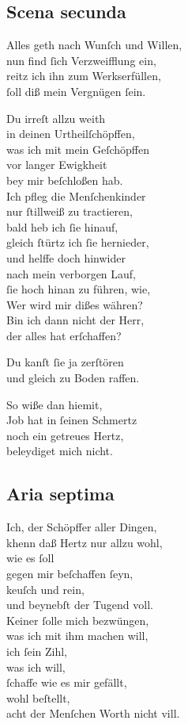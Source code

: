 \documentclass{ees}
\newenvironment{lyrics}[1]{%
  \subsection{#1}\nopagebreak%
  \begin{lyricslist}%
  \let\voice\item%
}{%
  \end{lyricslist}%
}
\begin{document}
\begin{lyrics}{Scena secunda}
  \voice[Leviathan]
  Alles geth nach Wunſch und Willen,\\
  nun find ſich Verzweifflung ein,\\
  reitz ich ihn zum Werkserfüllen,\\
  ſoll diß mein Vergnügen ſein.

  \voice[Schöpffer]
  Du irreſt allzu weith\\
  in deinen Urtheilſchöpffen,\\
  was ich mit mein Geſchöpffen\\
  vor langer Ewigkheit\\
  bey mir beſchloßen hab.\\
  Ich pfleg die Menſchenkinder\\
  nur ſtillweiß zu tractieren,\\
  bald heb ich ſie hinauf,\\
  gleich ſtürtz ich ſie hernieder,\\
  und helffe doch hinwider\\
  nach mein verborgen Lauf,\\
  ſie hoch hinan zu führen, wie,\\
  Wer wird mir dißes währen?\\
  Bin ich dann nicht der Herr,\\
  der alles hat erſchaffen?

  \voice[Leviathan]
  Du kanſt ſie ja zerſtören\\
  und gleich zu Boden raffen.

  \voice[Schöpffer]
  So wiße dan hiemit,\\
  Job hat in ſeinen Schmertz\\
  noch ein getreues Hertz,\\
  beleydiget mich nicht.
\end{lyrics}
\clearpage
\begin{lyrics}{Aria septima}
  \voice[Schöpffer]
  Ich, der Schöpffer aller Dingen,\\
  khenn daß Hertz nur allzu wohl,\\
  wie es ſoll\\
  gegen mir beſchaffen ſeyn,\\
  keuſch und rein,\\
  und beynebſt der Tugend voll.\\[1ex]
  Keiner ſolle mich bezwüngen,\\
  was ich mit ihm machen will,\\
  ich ſein Zihl,\\
  was ich will,\\
  ſchaffe wie es mir gefällt,\\
  wohl beſtellt,\\
  acht der Menſchen Worth nicht vill.
\end{lyrics}
\end{document}
